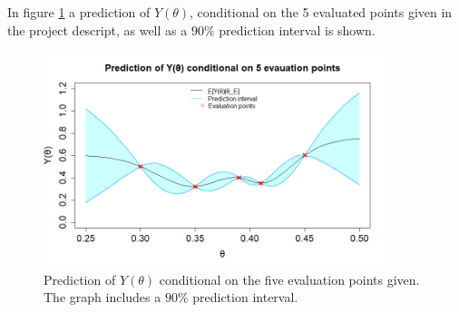 
 In figure \ref{2afiveeval} a prediction of $Y(\theta)$, conditional on the 5 evaluated points given in the project descript, as well as a $90\%$ prediction interval is shown.
 
\begin{figure}
    \centering
    \includegraphics[width=100mm]{2aPlot.png}
    \caption{Prediction of $Y(\theta)$ conditional on the five evaluation points given. The graph includes a $90\%$ prediction interval. }
    \label{2afiveeval}
\end{figure}


